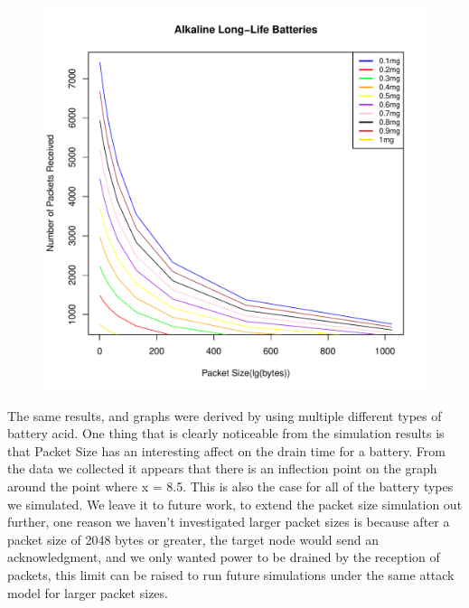 \begin{figure}[h!]
\centering
{}
\includegraphics[width = \linewidth]{Figures/BatteryDepletionPackets/NonLog/ALLiBATpktnonl.pdf}
\end{figure}

The same results, and graphs were derived by using multiple different types of battery acid. One thing that is clearly noticeable from the simulation results is that Packet Size has an interesting affect on the drain time for a battery. From the data we collected it appears that there is an inflection point on the graph around the point where x = 8.5. This is also the case for all of the battery types we simulated. We leave it to future work, to extend the packet size simulation out further, one reason we haven't investigated larger packet sizes is because after a packet size of 2048 bytes or greater, the target node would send an acknowledgment, and we only wanted power to be drained by the reception of packets, this limit can be raised to run future simulations under the same attack model for larger packet sizes.
